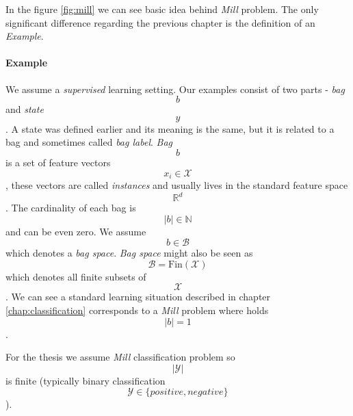 In the figure \ref{fig:mill} we can see basic idea behind \emph{Mill} problem. The only significant difference regarding the previous chapter is the definition of an \emph{Example}. 
\paragraph{Example}
We assume a \emph{supervised} learning setting. Our examples consist of two parts - \emph{bag} $$b$$ and \emph{state} $$y$$. A state was defined earlier and its meaning is the same, but it is related to a bag and sometimes called \emph{bag label}. \emph{Bag} $$b$$ is a set of feature vectors $$x_i\in\mathcal{X}$$, these vectors are called \emph{instances} and usually lives in the standard feature space $$\mathbb{R}^{d}$$. The cardinality of each bag is $$|b| \in \mathbb{N}$$ and can be even zero. We assume $$b \in \mathcal{B}$$ which denotes a \emph{bag space}. \emph{Bag space} might also be seen as $$\mathcal{B} = \mathrm{Fin}(\mathcal{X})$$ which denotes all finite subsets of $$\mathcal{X}$$. We can see a standard learning situation described in chapter \ref{chap:classification} corresponds to a \emph{Mill} problem where holds $$|b| = 1$$.

For the thesis we assume \emph{Mill} classification problem so $$|\mathcal{Y}|$$ is finite (typically binary classification $$\mathcal{Y} \in \{positive, negative\}$$). 

